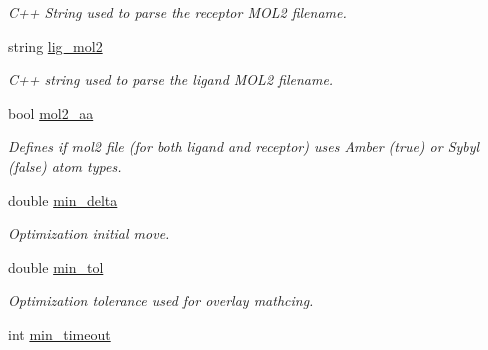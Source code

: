 \begin{DoxyCompactItemize}
\begin{DoxyCompactList}\small\item\em C++ String used to parse the receptor MOL2 filename. \item\end{DoxyCompactList}\item 
\hypertarget{classPARSER_ae66165af4c30950c92bc8c4a80e017e1}{
string \hyperlink{classPARSER_ae66165af4c30950c92bc8c4a80e017e1}{lig\_\-mol2}}
\label{classPARSER_ae66165af4c30950c92bc8c4a80e017e1}

\begin{DoxyCompactList}\small\item\em C++ string used to parse the ligand MOL2 filename. \item\end{DoxyCompactList}\item 
\hypertarget{classPARSER_ab18627e5c7322611d1b6e89163a7dc3a}{
bool \hyperlink{classPARSER_ab18627e5c7322611d1b6e89163a7dc3a}{mol2\_\-aa}}
\label{classPARSER_ab18627e5c7322611d1b6e89163a7dc3a}

\begin{DoxyCompactList}\small\item\em Defines if mol2 file (for both ligand and receptor) uses Amber (true) or Sybyl (false) atom types. \item\end{DoxyCompactList}\item 
\hypertarget{classPARSER_a8829bc2543c6c1edcc502ac74ce90299}{
double \hyperlink{classPARSER_a8829bc2543c6c1edcc502ac74ce90299}{min\_\-delta}}
\label{classPARSER_a8829bc2543c6c1edcc502ac74ce90299}

\begin{DoxyCompactList}\small\item\em Optimization initial move. \item\end{DoxyCompactList}\item 
\hypertarget{classPARSER_af5c5436be0d510e3b55358f345fb7474}{
double \hyperlink{classPARSER_af5c5436be0d510e3b55358f345fb7474}{min\_\-tol}}
\label{classPARSER_af5c5436be0d510e3b55358f345fb7474}

\begin{DoxyCompactList}\small\item\em Optimization tolerance used for overlay mathcing. \item\end{DoxyCompactList}\item 
\hypertarget{classPARSER_af6dec57a6c5a37158329ea62fea32f8f}{
int \hyperlink{classPARSER_af6dec57a6c5a37158329ea62fea32f8f}{min\_\-timeout}}
\label{classPARSER_af6dec57a6c5a37158329ea62fea32f8f}


\end{DoxyCompactItemize}
